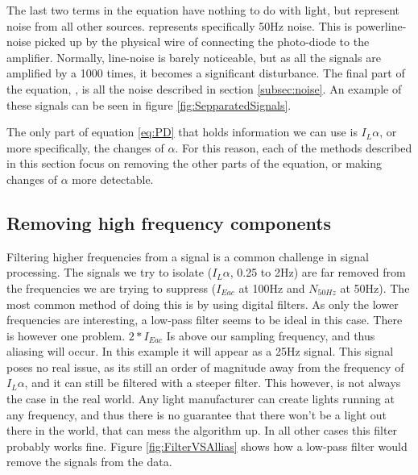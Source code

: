 The last two terms in the equation have nothing to do with light, but represent noise from all other sources.  represents specifically 50Hz noise. This is powerline-noise picked up by the physical wire of connecting the photo-diode to the amplifier. Normally, line-noise is barely noticeable, but as all the signals are amplified by a 1000 times, it becomes a significant disturbance. The final part of the equation, , is all the noise described in section \ref{subsec:noise}. An example of these signals can be seen in figure \ref{fig:SepparatedSignals}.

The only part of equation \ref{eq:PD} that holds information we can use is $I_{L} \alpha$, or more specifically, the changes of $\alpha$. For this reason, each of the methods described in this section focus on removing the other parts of the equation, or making changes of $\alpha$ more detectable.


\subsection{Removing high frequency components}
\label{subsec:removeing_AC}
Filtering higher frequencies from a signal is a common challenge in signal processing. The signals we try to isolate ($I_{L}\alpha$, 0.25 to 2Hz) are far removed from the frequencies we are trying to suppress ($I_{Eac}$ at 100Hz and $N_{50Hz}$ at 50Hz). The most common method of doing this is by using digital filters. As only the lower frequencies are interesting, a low-pass filter seems to be ideal in this case. There is however one problem. $2 * I_{Eac}$ Is above our sampling frequency, and thus aliasing will occur. In this example it will appear as a 25Hz signal. This signal poses no real issue, as its still an order of magnitude away from the frequency of $ I_{L} \alpha$, and it can still be filtered with a steeper filter. This however, is not always the case in the real world. Any light manufacturer can create lights running at any frequency, and thus there is no guarantee that there won't be a light out there in the world, that can mess the algorithm up. In all other cases this filter probably works fine. Figure \ref{fig:FilterVSAllias} shows how a low-pass filter would remove the signals from the data.


